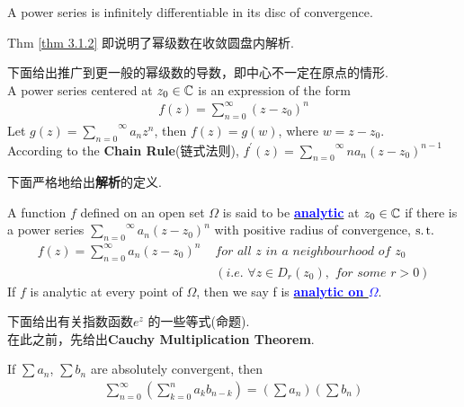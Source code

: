 \begin{corollary}\label{cor 3.1.3}
	A power series is infinitely differentiable in its disc of convergence.
	
	\begin{rmk}
		Thm \ref{thm 3.1.2} 即说明了幂级数在收敛圆盘内解析.
	\end{rmk}
\end{corollary}

\vspace{2em}
下面给出推广到更一般的幂级数的导数，即中心不一定在原点的情形.\\
A power series centered at $z_0 \in \mathbb{C}$ is an expression of the form
\begin{align}
	f(z) = \sum_{n = 0}^{\infty}{(z - z_0)^n}
\end{align}
Let $g(z) = \overset{\infty}{\underset{n = 0}{\sum}}{a_n z^n}$, then $f(z) = g(w)$, where $w = z - z_0$.\\
According to the \textbf{Chain Rule}(链式法则), $f^{'}(z) = \overset{\infty}{\underset{n = 0}{\sum}}{n a_n (z - z_0)^{n - 1}}$

\vspace{2em}
下面严格地给出\textbf{解析}的定义.
\begin{defn}\label{def 3.1.1}
	A function $f$ defined on an open set $\Omega$ is said to be \underline{\textcolor{blue}{\textbf{analytic}}} at $z_0 \in \mathbb{C}$ if there is a power series $\overset{\infty}{\underset{n = 0}{\sum}}{a_n (z - z_0)^n}$ with positive radius of convergence, $\operatorname{s.t.}$
	\begin{align}
		f(z) = \sum_{n = 0}^{\infty}{a_n (z - z_0)^n} \,\, &for \,\, all \,\, z \,\, in \,\, a \,\, neighbourhood \,\, of \,\, z_0 \\
		&(i.e. \,\, \forall z \in D_{r}(z_0) , \,\, for \,\, some \,\, r > 0)
	\end{align}
	If $f$ is analytic at every point of $\Omega$, then we say f is \underline{\textcolor{blue}{\textbf{analytic on $\Omega$}}}.
\end{defn}

\newpage
下面给出有关指数函数$e^z$ 的一些等式(命题).\\
在此之前，先给出\textbf{Cauchy Multiplication Theorem}.
\begin{lemma}\label{lemma 3.1.4}
	If $\sum{a_n}$, $\sum{b_n}$ are absolutely convergent, then
	\begin{align}
		\sum_{n = 0}^{\infty}{\left( \sum_{k = 0}^{n}{a_k b_{n - k}} \right)} = \left( \sum{a_n} \right) \left( \sum{b_n} \right)
	\end{align}
\end{lemma}

